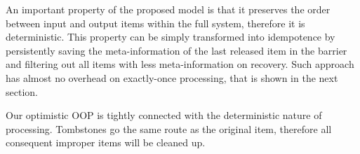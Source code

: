 \label {fs-short-discussion}

An important property of the proposed model is that it preserves the order between input and output items within the full system, therefore it is deterministic. This property can be simply transformed into idempotence by persistently saving the meta-information of the last released item in the barrier and filtering out all items with less meta-information on recovery. Such approach has almost no overhead on exactly-once processing, that is shown in the next section. 

Our optimistic OOP is tightly connected with the deterministic nature of processing. Tombstones go the same route as the original item, therefore all consequent improper items will be cleaned up.